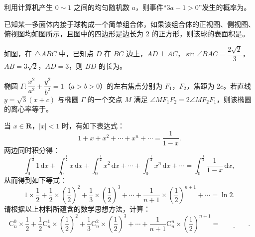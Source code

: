 \begin{question}
利用计算机产生 $0\sim1$ 之间的均匀随机数 $a$，则事件“$3a-1>0$”发生的概率为\gkblank{}。

\Needspace{0.4\textheight}
\end{question}
\begin{question}
已知某一多面体内接于球构成一个简单组合体，如果该组合体的正视图、侧视图、俯视图均如图所示，且图中的四边形是边长为 $2$ 的正方形，则该球的表面积是\gkblank{}。
\nopagebreak[4]
\begin{center}\end{center}
\nopagebreak[4]
\Needspace{0.4\textheight}
\end{question}
\begin{question}
如图，在 $\triangle ABC$ 中，已知点 $D$ 在 $BC$ 边上，$AD\perp AC$，$\sin\angle BAC=\dfrac{2\sqrt2}{3}$，$AB=3\sqrt2$，$AD=3$，则 $BD$ 的长为\gkblank{}。
\nopagebreak[4]
\begin{center}\end{center}
\nopagebreak[4]
\end{question}
\begin{question}
椭圆 $\Gamma:\dfrac{x^2}{a^2}+\dfrac{y^2}{b^2}=1$（$a>b>0$）的左右焦点分别为 $F_1$，$F_2$，焦距为 $2c$。若直线 $y=\sqrt3(x+c)$ 与椭圆 $\Gamma$ 的一个交点 $M$ 满足 $\angle MF_1F_2=2\angle MF_2F_1$，则该椭圆的离心率等于\gkblank{}。

\end{question}
\begin{question}
当 $x\in\mathbf R$，$|x|<1$ 时，有如下表达式：
\nopagebreak[4]
\[1+x+x^2+\cdots+x^n+\cdots=\frac1{1-x}.\]
两边同时积分得：
\nopagebreak[4]
\[\int_0^{\frac12}1\,\mathrm dx+\int_0^{\frac12}x\,\mathrm dx+\int_0^{\frac12}x^2\,\mathrm dx+\cdots+\int_0^{\frac12}x^n\,\mathrm dx+\cdots=\int_0^{\frac12}\frac1{1-x}\,\mathrm dx,\]
从而得到如下等式：
\nopagebreak[4]
\[1\times\frac12+\frac12\times\left(\frac12\right)^2+\frac13\times\left(\frac12\right)^3+\cdots+\frac1{n+1}\times\left(\frac12\right)^{n+1}+\cdots=\ln2.\]
请根据以上材料所蕴含的数学思想方法，计算：
\nopagebreak[4]
\[\mathrm C_n^0\times\frac12+\frac12\mathrm C_n^1\times\left(\frac12\right)^2+\frac13\mathrm C_n^2\times\left(\frac12\right)^3+\cdots+\frac1{n+1}\mathrm C_n^n\times\left(\frac12\right)^{n+1}=\underline{\qquad\qquad}.\]

\end{question}


